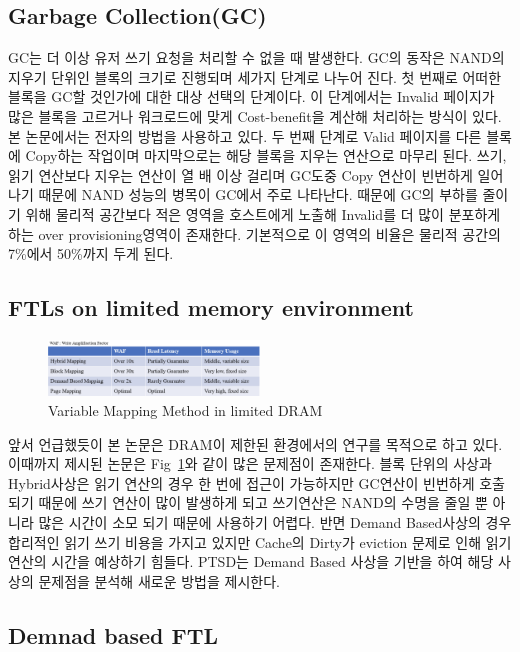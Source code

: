 \documentclass[conference]{IEEEtran}
\begin{document}
\subsection{Garbage Collection(GC)}
GC는 더 이상 유저 쓰기 요청을 처리할 수 없을 때 발생한다. GC의 동작은 NAND의 지우기 단위인 블록의 크기로 진행되며 세가지 단계로 나누어 진다. 첫 번째로 어떠한 블록을 GC할 것인가에 대한 대상 선택의 단계이다. 이 단계에서는 Invalid 페이지가 많은 블록을 고르거나 워크로드에 맞게 Cost-benefit을 계산해 처리하는 방식이 있다. 본 논문에서는 전자의 방법을 사용하고 있다. 두 번째 단계로 Valid 페이지를 다른 블록에 Copy하는 작업이며 마지막으로는 해당 블록을 지우는 연산으로 마무리 된다.
쓰기, 읽기 연산보다 지우는 연산이 열 배 이상 걸리며 GC도중 Copy 연산이 빈번하게 일어나기 때문에 NAND 성능의 병목이 GC에서 주로 나타난다. 때문에 GC의 부하를 줄이기 위해 물리적 공간보다 적은 영역을 호스트에게 노출해 Invalid를 더 많이 분포하게 하는 over provisioning영역이 존재한다. 기본적으로 이 영역의 비율은 물리적 공간의 7\%에서 50\%까지 두게 된다.

\subsection{FTLs on limited memory environment}
\begin{figure}[h]
	\centering
	\includegraphics[width=0.5\textwidth]{image/bg/Map.png}
	\caption{Variable Mapping Method in limited DRAM}
	\label{fig:Map}
\end{figure}
앞서 언급했듯이 본 논문은 DRAM이 제한된 환경에서의 연구를 목적으로 하고 있다. 이때까지 제시된 논문은 Fig~\ref{fig:Map}와 같이 많은 문제점이 존재한다. 블록 단위의 사상과 Hybrid사상은 읽기 연산의 경우 한 번에 접근이 가능하지만 GC연산이 빈번하게 호출되기 때문에 쓰기 연산이 많이 발생하게 되고 쓰기연산은 NAND의 수명을 줄일 뿐 아니라 많은 시간이 소모 되기 때문에 사용하기 어렵다. 반면 Demand Based사상의 경우 합리적인 읽기 쓰기 비용을 가지고 있지만 Cache의 Dirty가 eviction 문제로 인해 읽기 연산의 시간을 예상하기 힘들다. PTSD는 Demand Based 사상을 기반을 하여 해당 사상의 문제점을 분석해 새로운 방법을 제시한다.

\subsection{Demnad based FTL}
\end{document}
